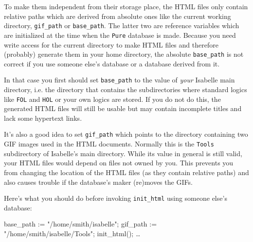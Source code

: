 To make them independent from their storage place, the HTML files only
contain relative paths which are derived from absolute ones like the
current working directory, {\tt gif_path} or {\tt base_path}. The
latter two are reference variables which are initialized at the time
when the {\tt Pure} database is made. Because you need write access
for the current directory to make HTML files and therefore (probably)
generate them in your home directory, the absolute {\tt base_path} is
not correct if you use someone else's database or a database derived
from it.

In that case you first should set {\tt base_path} to the value of {\em
your} Isabelle main directory, i.e. the directory that contains the
subdirectories where standard logics like {\tt FOL} and {\tt HOL} or
your own logics are stored. If you do not do this, the generated HTML
files will still be usable but may contain incomplete titles and lack
some hypertext links.

It's also a good idea to set {\tt gif_path} which points to the
directory containing two GIF images used in the HTML
documents. Normally this is the {\tt Tools} subdirectory of Isabelle's
main directory. While its value in general is still valid, your HTML
files would depend on files not owned by you. This prevents you from
changing the location of the HTML files (as they contain relative
paths) and also causes trouble if the database's maker (re)moves the
GIFs.

Here's what you should do before invoking {\tt init_html} using
someone else's \ML{} database:

\begin{ttbox}
base_path := "/home/smith/isabelle";
gif_path := "/home/smith/isabelle/Tools";
init_html();
\dots
\end{ttbox}

